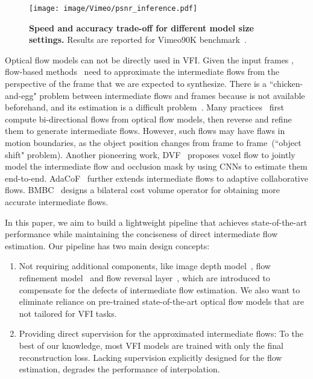 \documentclass[final]{cvpr}
\begin{document}
\begin{figure}
	\centering
	\texttt{[image: image/Vimeo/psnr\_inference.pdf]}
	\caption{\textbf{Speed and accuracy trade-off for different model size settings.} Results are reported for Vimeo90K benchmark~\cite{xue2019video}.} \label{fig:intro_fig}
	\vspace{-1em}
\end{figure}

Optical flow models can not be directly used in VFI. Given the input frames , flow-based methods~\cite{liu2017video,jiang2018super,bao2019depth} need to approximate the intermediate flows  from the perspective of the frame  that we are expected to synthesize. There is a ``chicken-and-egg" problem between intermediate flows and frames because  is not available beforehand, and its estimation is a difficult problem~\cite{jiang2018super, park2020bmbc}. Many practices~\cite{jiang2018super, bao2019depth, xu2019quadratic, liu2020enhanced} first compute bi-directional flows from optical flow models, then reverse and refine them to generate intermediate flows. However, such flows may have flaws in motion boundaries, as the object position changes from frame to frame~(``object shift" problem). Another pioneering work, DVF~\cite{liu2017video} proposes voxel flow to jointly model the intermediate flow and occlusion mask by using CNNs to estimate them end-to-end. AdaCoF~\cite{lee2020adacof} further extends intermediate flows to adaptive collaborative flows. BMBC~\cite{park2020bmbc} designs a bilateral cost volume operator for obtaining more accurate intermediate flows. 

In this paper, we aim to build a lightweight pipeline that achieves state-of-the-art performance while maintaining the conciseness of direct intermediate flow estimation. Our pipeline has two main design concepts: \begin{enumerate}[1)] 
	\item Not requiring additional components, like image depth model~\cite{bao2019depth}, flow refinement model~\cite{jiang2018super} and flow reversal layer~\cite{xu2019quadratic}, which are introduced to compensate for the defects of intermediate flow estimation. We also want to eliminate reliance on pre-trained state-of-the-art optical flow models that are not tailored for VFI tasks. 
	\item Providing direct supervision for the approximated intermediate flows: To the best of our knowledge, most VFI models are trained with only the final reconstruction loss. Lacking supervision explicitly designed for the flow estimation, degrades the performance of interpolation.
\end{enumerate}
\end{document}
